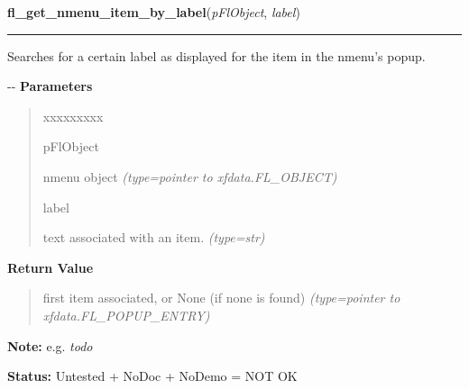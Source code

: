     \vspace{0.5ex}

\hspace{.8\funcindent}\begin{boxedminipage}{\funcwidth}

    \raggedright \textbf{fl\_get\_nmenu\_item\_by\_label}(\textit{pFlObject}, \textit{label})

    \vspace{-1.5ex}

    \rule{\textwidth}{0.5\fboxrule}
\setlength{\parskip}{2ex}

Searches for a certain label as displayed for the item in the nmenu's
popup.

-{}-
\setlength{\parskip}{1ex}
      \textbf{Parameters}
      \vspace{-1ex}

      \begin{quote}
        \begin{Ventry}{xxxxxxxxx}

          \item[pFlObject]


nmenu object
            {\it (type=pointer to xfdata.FL\_OBJECT)}

          \item[label]


text associated with an item.
            {\it (type=str)}

        \end{Ventry}

      \end{quote}

      \textbf{Return Value}
    \vspace{-1ex}

      \begin{quote}

first item associated, or None (if none is found)
      {\it (type=pointer to xfdata.FL\_POPUP\_ENTRY)}

      \end{quote}

\textbf{Note:} 
e.g. \emph{todo}


\textbf{Status:} 
Untested + NoDoc + NoDemo = NOT OK


    \end{boxedminipage}

    \label{xformslib:flnmenu:fl_get_nmenu_item_by_text}

